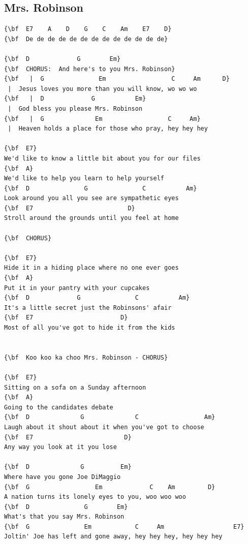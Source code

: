 \documentclass[a4paper]{article}
\begin{document}
\subsection{Mrs. Robinson}
\begin{Verbatim}[commandchars=\\\{\}]
{\bf  E7    A    D    G    C    Am    E7    D}
{\bf  De de de de de de de de de de de de de}

{\bf  D             G        Em}
{\bf  CHORUS:  And here's to you Mrs. Robinson}
{\bf   |  G               Em                  C     Am      D}
 |  Jesus loves you more than you will know, wo wo wo
{\bf   |  D             G           Em}
 |  God bless you please Mrs. Robinson
{\bf   |  G              Em                  C     Am}
 |  Heaven holds a place for those who pray, hey hey hey

{\bf  E7}
We'd like to know a little bit about you for our files
{\bf  A}
We'd like to help you learn to help yourself
{\bf  D               G               C           Am}
Look around you all you see are sympathetic eyes
{\bf  E7                          D}
Stroll around the grounds until you feel at home

{\bf  CHORUS}

{\bf  E7}
Hide it in a hiding place where no one ever goes
{\bf  A}
Put it in your pantry with your cupcakes
{\bf  D             G               C           Am}
It's a little secret just the Robinsons' afair
{\bf  E7                        D}
Most of all you've got to hide it from the kids


{\bf  Koo koo ka choo Mrs. Robinson - CHORUS}

{\bf  E7}
Sitting on a sofa on a Sunday afternoon
{\bf  A}
Going to the candidates debate
{\bf  D              G              C                  Am}
Laugh about it shout about it when you've got to choose
{\bf  E7                         D}
Any way you look at it you lose

{\bf  D              G          Em}
Where have you gone Joe DiMaggio
{\bf  G                  Em             C    Am         D}
A nation turns its lonely eyes to you, woo woo woo
{\bf  D               G        Em}
What's that you say Mrs. Robinson
{\bf  G               Em            C     Am                   E7}
Joltin' Joe has left and gone away, hey hey hey, hey hey hey

\end{Verbatim}
\newpage
\end{document}
